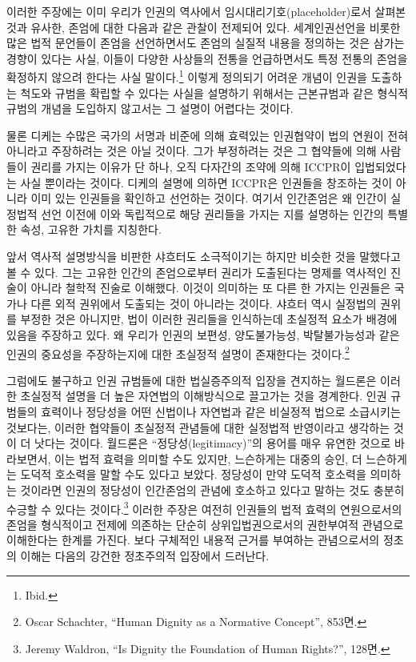 이러한 주장에는 이미 우리가 인권의 역사에서 임시대리기호(placeholder)로서 살펴본 것과 유사한, 존엄에 대한 다음과 같은 관찰이 전제되어 있다. 세계인권선언을 비롯한 많은 법적 문언들이 존엄을 선언하면서도 존엄의 실질적 내용을 정의하는 것은 삼가는 경향이 있다는 사실, 이들이 다양한 사상들의 전통을 언급하면서도 특정 전통의 존엄을 확정하지 않으려 한다는 사실 말이다.\footnote{Ibid.} 이렇게 정의되기 어려운 개념이 인권을 도출하는 척도와 규범을 확립할 수 있다는 사실을 설명하기 위해서는 근본규범과 같은 형식적 규범의 개념을 도입하지 않고서는 그 설명이 어렵다는 것이다.

물론 디케는 수많은 국가의 서명과 비준에 의해 효력있는 인권협약이 법의 연원이 전혀 아니라고 주장하려는 것은 아닐 것이다. 그가 부정하려는 것은 그 협약들에 의해 사람들이 권리를 가지는 이유가 단 하나, 오직 다자간의 조약에 의해 ICCPR이 입법되었다는 사실 뿐이라는 것이다. 디케의 설명에 의하면 ICCPR은 인권들을 창조하는 것이 아니라 이미 있는 인권들을 확인하고 선언하는 것이다. 여기서 인간존엄은 왜 인간이 실정법적 선언 이전에 이와 독립적으로 해당 권리들을 가지는 지를 설명하는 인간의 특별한 속성, 고유한 가치를 지칭한다.

앞서 역사적 설명방식을 비판한 샤흐터도 소극적이기는 하지만 비슷한 것을 말했다고 볼 수 있다. 그는 고유한 인간의 존엄으로부터 권리가 도출된다는 명제를 역사적인 진술이 아니라 철학적 진술로 이해했다. 이것이 의미하는 또 다른 한 가지는 인권들은 국가나 다른 외적 권위에서 도출되는 것이 아니라는 것이다. 샤흐터 역시 실정법의 권위를 부정한 것은 아니지만, 법이 이러한 권리들을 인식하는데 초실정적 요소가 배경에 있음을 주장하고 있다. 왜 우리가 인권의 보편성, 양도불가능성, 박탈불가능성과 같은 인권의 중요성을 주장하는지에 대한 초실정적 설명이 존재한다는 것이다.\footnote{Oscar Schachter, ``Human Dignity as a Normative Concept'', 853면.}

그럼에도 불구하고 인권 규범들에 대한 법실증주의적 입장을 견지하는 월드론은 이러한 초실정적 설명을 더 높은 자연법의 이해방식으로 끌고가는 것을 경계한다. 인권 규범들의 효력이나 정당성을 어떤 신법이나 자연법과 같은 비실정적 법으로 소급시키는 것보다는, 이러한 협약들이 초실정적 관념들에 대한 실정법적 반영이라고 생각하는 것이 더 낫다는 것이다. 월드론은 ``정당성(legitimacy)''의 용어를 매우 유연한 것으로 바라보면서, 이는 법적 효력을 의미할 수도 있지만, 느슨하게는 대중의 승인, 더 느슨하게는 도덕적 호소력을 말할 수도 있다고 보았다. 정당성이 만약 도덕적 호소력을 의미하는 것이라면 인권의 정당성이 인간존엄의 관념에 호소하고 있다고 말하는 것도 충분히 수긍할 수 있다는 것이다.\footnote{Jeremy Waldron, ``Is Dignity the Foundation of Human Rights?'', 128면.} 이러한 주장은 여전히 인권들의 법적 효력의 연원으로서의 존엄을 형식적이고 전제에 의존하는 단순히 상위입법권으로서의 권한부여적 관념으로 이해한다는 한계를 가진다. 보다 구체적인 내용적 근거를 부여하는 관념으로서의 정초의 이해는 다음의 강건한 정초주의적 입장에서 드러난다.

